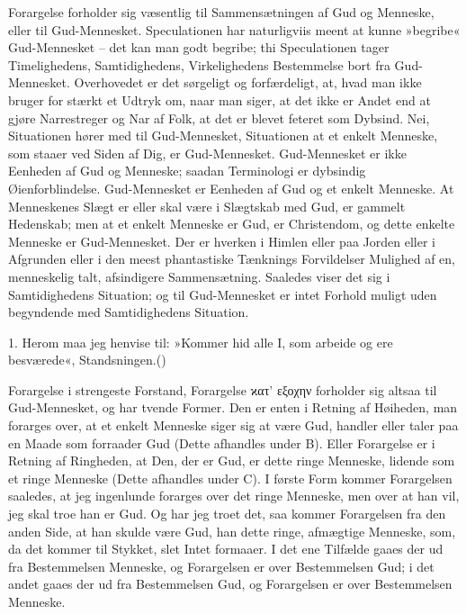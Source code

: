 \documentclass[12pt,a4paper]{article}
\begin{document}
Forargelse forholder sig væsentlig til Sammensætningen af Gud og Menneske, eller til Gud-Mennesket. Speculationen har naturligviis meent at kunne »begribe« Gud-Mennesket – det kan man godt begribe; thi Speculationen tager Timelighedens, Samtidighedens, Virkelighedens Bestemmelse bort fra Gud-Mennesket. Overhovedet er det sørgeligt og forfærdeligt, at, hvad man ikke bruger for stærkt et Udtryk om, naar man siger, at det ikke er Andet end at gjøre Narrestreger og Nar af Folk, at det er blevet feteret som Dybsind. Nei, Situationen hører med til Gud-Mennesket, Situationen at et enkelt Menneske, som staaer ved Siden af Dig, er Gud-Mennesket. Gud-Mennesket er ikke Eenheden af Gud og Menneske; saadan Terminologi er dybsindig Øienforblindelse. Gud-Mennesket er Eenheden af Gud og et enkelt Menneske. At Menneskenes Slægt er eller skal være i Slægtskab med Gud, er gammelt Hedenskab; men at et enkelt Menneske er Gud, er Christendom, og dette enkelte Menneske er Gud-Mennesket. Der er hverken i Himlen eller paa Jorden eller i Afgrunden eller i den meest phantastiske Tænknings Forvildelser Mulighed af en, menneskelig talt, afsindigere Sammensætning. Saaledes viser det sig i Samtidighedens Situation; og til Gud-Mennesket er intet Forhold muligt uden begyndende med Samtidighedens Situation.

1. Herom maa jeg henvise til: »Kommer hid alle I, som arbeide og ere besværede«, Standsningen.()

Forargelse i strengeste Forstand, Forargelse ϰατ' εξοχην forholder sig altsaa til Gud-Mennesket, og har tvende Former. Den er enten i Retning af Høiheden, man forarges over, at et enkelt Menneske siger sig at være Gud, handler eller taler paa en Maade som forraader Gud (Dette afhandles under B). Eller Forargelse er i Retning af Ringheden, at Den, der er Gud, er dette ringe Menneske, lidende som et ringe Menneske (Dette afhandles under C). I første Form kommer Forargelsen saaledes, at jeg ingenlunde forarges over det ringe Menneske, men over at han vil, jeg skal troe han er Gud. Og har jeg troet det, saa kommer Forargelsen fra den anden Side, at han skulde være Gud, han dette ringe, afmægtige Menneske, som, da det kommer til Stykket, slet Intet formaaer. I det ene Tilfælde gaaes der ud fra Bestemmelsen Menneske, og Forargelsen er over Bestemmelsen Gud; i det andet gaaes der ud fra Bestemmelsen Gud, og Forargelsen er over Bestemmelsen Menneske.
\end{document}

